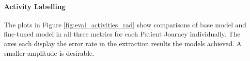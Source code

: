 \paragraph{Activity Labelling} The plots in Figure \ref{fig:eval_activities_rad} show comparisons of base model and fine-tuned model in all three metrics for each Patient Journey individually. The axes each display the error rate in the extraction results the models achieved. A smaller amplitude is desirable.\\
\begin{figure}
  \centering

\end{figure}
